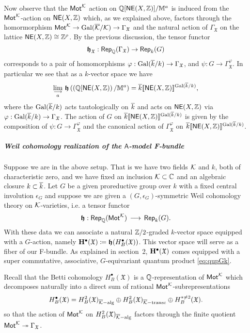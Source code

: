 \documentclass[twoside,leqno]{article}
\numberwithin{equation}{section}
\theoremstyle{plain}
\theoremstyle{definition}
\begin{document}
Now observe that the $\mathsf{Mot}^{\mathcal K}$ action on
$\mathbb Q[\mathsf{NE}(X,\mathbb Z)]/\mathbb{M}^{a}$ is induced from the
$\mathsf{Mot}^{\mathcal K}$-action on $\mathsf{NE}(X,\mathbb Z)$ which, as we explained
above, factors through the homormorphism $\mathsf{Mot}^{\mathcal K} \to
\operatorname{Gal}(\overline{\mathcal K}/\mathcal K) \to \Gamma_{\mathfrak{X}}$ and the natural action
of $\Gamma_{\mathfrak{X}}$ on the lattice $\mathsf{NE}(X,\mathbb Z) \cong
\mathbb Z^{\rho}$. By the previous discussion, the tensor functor
\[
\boldsymbol{\mathfrak{h}}_{\mathfrak{X}} : \mathsf{Rep}_{\mathbb Q}(\Gamma_{\mathfrak{X}}) \to \mathsf{Rep}_{k}(G)
\]
corresponds to a pair of homomorphisms $\varphi : \operatorname{Gal}(\overline{k}/k) \to
\Gamma_{\mathfrak{X}}$, and $\psi : G \to
  \Gamma_{\mathfrak{X}}^{\varphi}$. In particular we see that as a
  $k$-vector space
we have
  \[
  \lim_{\substack{\longrightarrow \\ a}} \,
  \boldsymbol{\mathfrak{h}}\left(\left(\mathbb Q[\mathsf{NE}(X,\mathbb Z)\right)/\mathbb{M}^{a}\right)
    = \overline{k}[\![\mathsf{NE}(X,\mathbb Z)]\!]^{\operatorname{Gal}(\overline{k}/k)},
    \]
    where the $\operatorname{Gal}(\overline{k}/k)$ acts tautologically on $\overline{k}$ and acts
    on $\mathsf{NE}(X,\mathbb Z)$ via $\varphi : \operatorname{Gal}(\overline{k}/k) \to
    \Gamma_{\mathfrak{X}}$. The action of $G$ on
    $\overline{k}[\![\mathsf{NE}(X,\mathbb Z)]\!]^{\operatorname{Gal}(\overline{k}/k)}$ is given by the
    composition of $\psi : G \to \Gamma_{\mathfrak{X}}^{\varphi}$ and
    the canonical action of $\Gamma_{\mathfrak{X}}^{\varphi}$ on
    $\overline{k}[\![\mathsf{NE}(X,\mathbb Z)]\!]^{\operatorname{Gal}(\overline{k}/k)}$.

\subparagraph{Weil cohomology realization of the \texorpdfstring{$\mathsf{A}$}{A}-model F-bundle} \label{subpar:twistF}

Suppose we are in the above setup. That is we have two fields $\mathcal K$
and $k$, both of characteristic zero, and we have fixed an inclusion
$\mathcal K \subset \mathbb C$ and an algebraic closure $k \subset \overline{k}$.  Let
$G$ be a given proreductive group over $k$ with a fixed central
involution $\epsilon_{G}$ and suppose we are given a
$(G,\epsilon_{G})$-symmetric Weil cohomology theory on
$\mathcal K$-varieties, i.e. a tensor functor
\[
\boldsymbol{\mathfrak{h}} : \mathsf{Rep}_{\mathbb Q}(\mathsf{Mot}^{\mathcal K}) \,  \longrightarrow \,
\mathsf{Rep}_{k}(G).
\]
With these data we can associate a natural $\mathbb Z/2$-graded $k$-vector
space equipped with a $G$-action, namely $\mathbf{H}^{\bullet}(\mathfrak{X})
\coloneqq \boldsymbol{\mathfrak{h}}(H^{\bullet}_{B}(\mathfrak{X}))$. This vector space will serve
as a fiber of our F-bundle. As explained in section~2,
$\mathbf{H}^{\bullet}(\mathfrak{X})$ comes equipped with a super
commutative, associative, $G$-equivariant quantum product
\eqref{eq:qupGk}.


Recall that the Betti cohomology 
$H^{\bullet}_{B}(\mathfrak{X})$  is a $\mathbb Q$-representation
of $\mathsf{Mot}^{\mathcal K}$ which decomposes naturally into a direct sum of
rational $\mathsf{Mot}^{\mathcal K}$-subrepresentations
\[
H^{\bullet}_{B}(\mathfrak{X}) = H^{2}_{B}(\mathfrak{X})_{\overline{\mathcal K}-\operatorname{alg}} \oplus
H^{2}_{B}(\mathfrak{X})_{\overline{\mathcal K}-\operatorname{transc}} \oplus H^{* \neq
  2}_{B}(\mathfrak{X}).
\]
so that the action of $\mathsf{Mot}^{\mathcal K}$ on
$H^{2}_{B}(\mathfrak{X})_{\overline{\mathcal K}-\operatorname{alg}}$ factors through the
finite quotient $\mathsf{Mot}^{\mathcal K} \twoheadrightarrow
\Gamma_{\mathfrak{X}}$.
\end{document}

